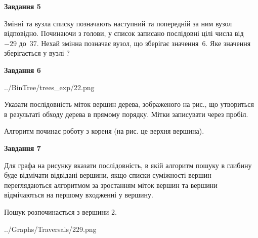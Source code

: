 \documentclass[12pt, ukrainian]{article}
\begin{document}
{\begin {large}
{\begin {center}\textbf{Завдання 5}\end {center}}\par
Змінні  та  вузла списку позначають наступний та попередній за ним вузол відповідно. Починаючи з голови, у список записано послідовні цілі числа від~$-29$ до~$37$. Нехай змінна  позначає вузол, що зберігає значення~$6$.
Яке значення зберігається у вузлі  ?\par
\newpage

{\begin {center}\textbf{Завдання 6}\end {center}}\par

\begin{center}
	{../BinTree/trees_exp/22.png}
\end{center}
Указати послідовність міток вершин дерева, зображеного на рис., що утвориться в результаті обходу дерева в прямому порядку. Мітки записувати через пробіл.\par Алгоритм починає роботу з кореня (на рис. це верхня вершина).\par
\newpage

{\begin {center}\textbf{Завдання 7}\end {center}}\par
Для графа на рисунку вказати послідовність, в якій алгоритм пошуку в глибину буде відмічати відвідані вершини, якщо списки суміжності вершин переглядаються алгоритмом за зростанням міток вершин та вершини відмічаються на першому вход\-женні у вершину.\par
Пошук розпочинається з вершини 2.\par

\begin{center}
	{../Graphs/Traversals/229.png}
\end{center}\par
\newpage


\end{large}}
\end{document}
